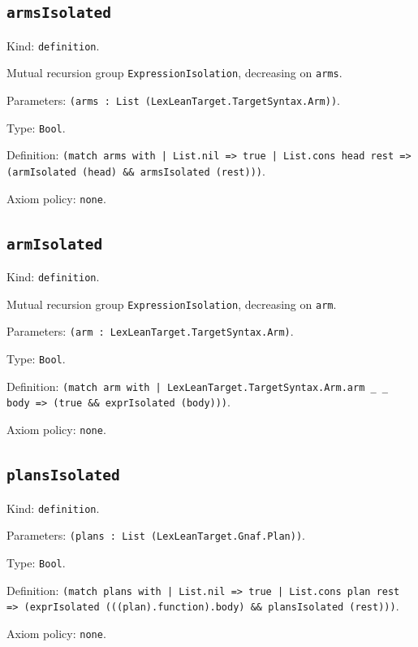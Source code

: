 \documentclass[11pt]{article}
\begin{document}
\subsection*{\texttt{armsIsolated}}
\noindent Kind: \texttt{definition}.\par
\noindent Mutual recursion group \texttt{ExpressionIsolation}, decreasing on \texttt{arms}.\par
\noindent Parameters: \texttt{(arms : List (LexLeanTarget.TargetSyntax.Arm))}.\par
\noindent Type: \texttt{Bool}.\par
\noindent Definition: \texttt{(match arms with | List.nil => true | List.cons head rest => (armIsolated (head) \&\& armsIsolated (rest)))}.\par
\noindent Axiom policy: \texttt{none}.\par
\subsection*{\texttt{armIsolated}}
\noindent Kind: \texttt{definition}.\par
\noindent Mutual recursion group \texttt{ExpressionIsolation}, decreasing on \texttt{arm}.\par
\noindent Parameters: \texttt{(arm : LexLeanTarget.TargetSyntax.Arm)}.\par
\noindent Type: \texttt{Bool}.\par
\noindent Definition: \texttt{(match arm with | LexLeanTarget.TargetSyntax.Arm.arm \_ \_ body => (true \&\& exprIsolated (body)))}.\par
\noindent Axiom policy: \texttt{none}.\par
\subsection*{\texttt{plansIsolated}}
\noindent Kind: \texttt{definition}.\par
\noindent Parameters: \texttt{(plans : List (LexLeanTarget.Gnaf.Plan))}.\par
\noindent Type: \texttt{Bool}.\par
\noindent Definition: \texttt{(match plans with | List.nil => true | List.cons plan rest => (exprIsolated (((plan).function).body) \&\& plansIsolated (rest)))}.\par
\noindent Axiom policy: \texttt{none}.\par
\end{document}
